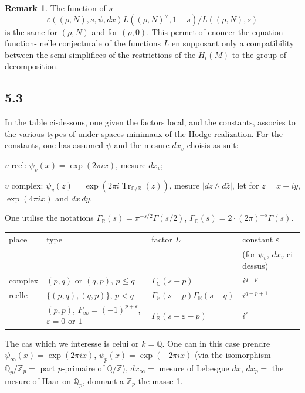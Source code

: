 \documentclass[12pt,a4paper]{article}
\theoremstyle{plain}
\theoremstyle{definition}
\newtheorem{remark}[definition]{Remark}
\theoremstyle{remark}
\DeclareMathOperator{\Tr}{Tr}
\newcommand{\Q}{\mathbb{Q}}
\newcommand{\R}{\mathbb{R}}
\newcommand{\C}{\mathbb{C}}
\newcommand{\Z}{\mathbb{Z}}
\begin{document}
\begin{remark}
The function of $s$
\[
\varepsilon((\rho, N), s, \psi, dx) L((\rho, N)^\vee, 1-s) / L((\rho, N), s)
\]
is the same for $(\rho, N)$ and for $(\rho, 0)$. This permet of enoncer the equation function-
nelle conjecturale of the functions $L$ en supposant only a compatibility between
the semi-simplifiees of the restrictions of the $H_l(M)$ to the group of decomposition.
\end{remark}

\subsection*{5.3}

In the table ci-dessous, one given the factors local, and the constants, associes
to the various types of under-spaces minimaux of the Hodge realization. For the
constants, one has assumed $\psi$ and the mesure $dx_v$ choisis as suit:

$v$ reel: $\psi_v(x) = \exp(2\pi i x)$, mesure $dx_v$;

$v$ complex: $\psi_v(z) = \exp(2\pi i \Tr_{\C/\R}(z))$, mesure $|dz \wedge d\bar{z}|$,
let for $z = x + iy$, $\exp(4\pi i x)$ and $dx \, dy$.

One utilise the notations $\Gamma_\R(s) = \pi^{-s/2} \Gamma(s/2)$, $\Gamma_\C(s) = 2 \cdot (2\pi)^{-s} \Gamma(s)$.

\begin{center}
\begin{tabular}{llll}
\toprule
place & type & factor $L$ & constant $\varepsilon$ \\
& & & (for $\psi_v$, $dx_v$ ci-dessus) \\
\midrule
complex & $(p,q)$ or $(q,p)$, $p \leq q$ & $\Gamma_\C(s-p)$ & $i^{q-p}$ \\
reelle & $\{(p,q), (q,p)\}$, $p < q$ & $\Gamma_\R(s-p)\Gamma_\R(s-q)$ & $i^{q-p+1}$ \\
& $(p,p)$, $F_\infty = (-1)^{p+\varepsilon}$, $\varepsilon = 0$ or $1$ & $\Gamma_\R(s+\varepsilon-p)$ & $i^\varepsilon$ \\
\bottomrule
\end{tabular}
\end{center}

The cas which we interesse is celui or $k = \Q$. One can in this case prendre
$\psi_\infty(x) = \exp(2\pi i x)$, $\psi_p(x) = \exp(-2\pi i x)$ (via the isomorphism $\Q_p/\Z_p =$
part $p$-primaire of $\Q/\Z$), $dx_\infty =$ mesure of Lebesgue $dx$, $dx_p =$ the mesure of
Haar on $\Q_p$, donnant a $\Z_p$ the masse 1.
\end{document}
